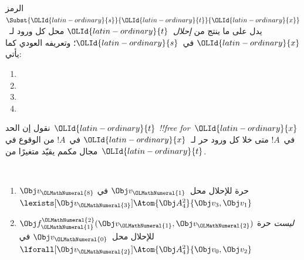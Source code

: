 \documentclass[../../../include/open-logic-section]{subfiles}
\begin{document}


\begin{defn}[الإحلال في حد]
الرمز $\Subst{\OLId{latin-ordinary}{s}}{\OLId{latin-ordinary}{t}}{\OLId{latin-ordinary}{x}}$ يدل على ما ينتج من \emph{إحلال}~$\OLId{latin-ordinary}{t}$
محل كل ورود لـ~$\OLId{latin-ordinary}{x}$ في~$\OLId{latin-ordinary}{s}$؛ وتعريفه العودي كما يأتي:
\begin{enumerate}
\item {}

\item {}

\item {}

\item{}
\end{enumerate}
\end{defn}

\begin{defn}
نقول إن الحد~$\OLId{latin-ordinary}{t}$ \emph{!!{free for}}~$\OLId{latin-ordinary}{x}$ في~$!A$ متى خلا كل ورود
حر لـ~$\OLId{latin-ordinary}{x}$ في~$!A$ من الوقوع في مجال مكمم يقيّد متغيرًا من~$\OLId{latin-ordinary}{t}$.
\end{defn}

\begin{ex} ~
\begin{enumerate}
\item $\Obj v_\OLMathNumeral{8}$ حرة للإحلال محل~$\Obj v_\OLMathNumeral{1}$ في
  $\lexists[\Obj v_\OLMathNumeral{3}]\Atom{\Obj A^2_4}{\Obj v_3,\Obj v_1}$

\item $\Obj f^\OLMathNumeral{2}_\OLMathNumeral{1}(\Obj v_\OLMathNumeral{1}, \Obj v_\OLMathNumeral{2})$ \emph{ليست} حرة للإحلال
  محل~$\Obj v_\OLMathNumeral{0}$ في
  $\lforall[\Obj v_\OLMathNumeral{2}]\Atom{\Obj A^2_4}{\Obj v_0,\Obj v_2}$
\end{enumerate}
\end{ex}
\end{document}
